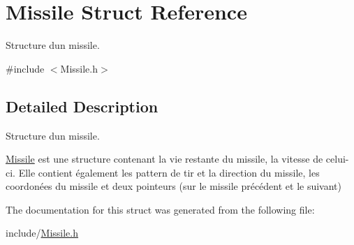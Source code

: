 \hypertarget{struct_missile}{}\section{Missile Struct Reference}
\label{struct_missile}


Structure d\textquotesingle{}un missile.  




{\ttfamily \#include $<$Missile.\+h$>$}



\subsection{Detailed Description}
Structure d\textquotesingle{}un missile. 

\hyperlink{struct_missile}{Missile} est une structure contenant la vie restante du missile, la vitesse de celui-\/ci. Elle contient également les pattern de tir et la direction du missile, les coordonées du missile et deux pointeurs (sur le missile précédent et le suivant) 

The documentation for this struct was generated from the following file\+:\begin{DoxyCompactItemize}
\item 
include/\hyperlink{_missile_8h}{Missile.\+h}\end{DoxyCompactItemize}
